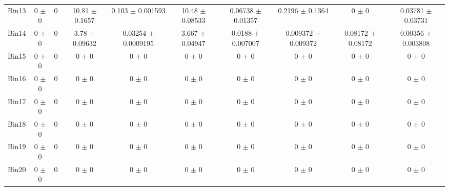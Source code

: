 \begin{tabular}{@{\extracolsep{4pt}}lccccccccc@{}}
     Bin13 & 0 $\pm$ 0 & 0 & 10.81 $\pm$ 0.1657 & 0.103 $\pm$ 0.001593 & 10.48 $\pm$ 0.08533 & 0.06738 $\pm$ 0.01357 & 0.2196 $\pm$ 0.1364 & 0 $\pm$ 0 & 0.03781 $\pm$ 0.03731 \\ 
     Bin14 & 0 $\pm$ 0 & 0 & 3.78 $\pm$ 0.09632 & 0.03254 $\pm$ 0.0009195 & 3.667 $\pm$ 0.04947 & 0.0188 $\pm$ 0.007007 & 0.009372 $\pm$ 0.009372 & 0.08172 $\pm$ 0.08172 & 0.00356 $\pm$ 0.003808 \\ 
     Bin15 & 0 $\pm$ 0 & 0 & 0 $\pm$ 0 & 0 $\pm$ 0 & 0 $\pm$ 0 & 0 $\pm$ 0 & 0 $\pm$ 0 & 0 $\pm$ 0 & 0 $\pm$ 0 \\ 
     Bin16 & 0 $\pm$ 0 & 0 & 0 $\pm$ 0 & 0 $\pm$ 0 & 0 $\pm$ 0 & 0 $\pm$ 0 & 0 $\pm$ 0 & 0 $\pm$ 0 & 0 $\pm$ 0 \\ 
     Bin17 & 0 $\pm$ 0 & 0 & 0 $\pm$ 0 & 0 $\pm$ 0 & 0 $\pm$ 0 & 0 $\pm$ 0 & 0 $\pm$ 0 & 0 $\pm$ 0 & 0 $\pm$ 0 \\ 
     Bin18 & 0 $\pm$ 0 & 0 & 0 $\pm$ 0 & 0 $\pm$ 0 & 0 $\pm$ 0 & 0 $\pm$ 0 & 0 $\pm$ 0 & 0 $\pm$ 0 & 0 $\pm$ 0 \\ 
     Bin19 & 0 $\pm$ 0 & 0 & 0 $\pm$ 0 & 0 $\pm$ 0 & 0 $\pm$ 0 & 0 $\pm$ 0 & 0 $\pm$ 0 & 0 $\pm$ 0 & 0 $\pm$ 0 \\ 
     Bin20 & 0 $\pm$ 0 & 0 & 0 $\pm$ 0 & 0 $\pm$ 0 & 0 $\pm$ 0 & 0 $\pm$ 0 & 0 $\pm$ 0 & 0 $\pm$ 0 & 0 $\pm$ 0 \\ 
\hline\hline
  \end{tabular}
